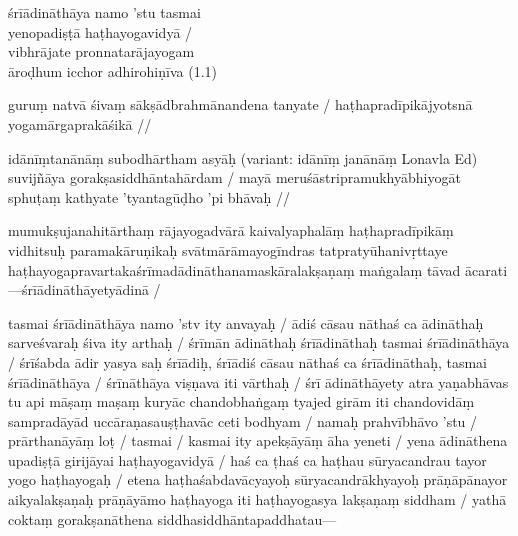 ﻿%


\setlength{\footmarkwidth}{1.3em}
\setlength{\footmarksep}{0em}
\setlength{\footparindent}{1.3em}
\usepackage{fnpos}
\makeFNbottom




\pagestyle{HPed} %
\begin{ekdosis}
  
  \begin{jyotsna}[hp01_001]
    śrīādināthāya namo ’stu tasmai \\
    yenopadiṣṭā haṭhayogavidyā  / \\
    vibhrājate pronnatarājayogam \\
    āroḍhum icchor adhirohiṇīva (1.1)     

    guruṃ natvā śivaṃ sākṣādbrahmānandena tanyate /
    haṭhapradīpikājyotsnā yogamārgaprakāśikā //

    idānīṃtanānāṃ subodhārtham asyāḥ     (variant: idānīṃ janānāṃ Lonavla Ed) 	
    suvijñāya gorakṣasiddhāntahārdam /
    mayā meruśāstripramukhyābhiyogāt
    sphuṭaṃ kathyate 'tyantagūḍho 'pi bhāvaḥ //

    mumukṣujanahitārthaṃ rājayogadvārā kaivalyaphalāṃ haṭhapradīpikāṃ vidhitsuḥ paramakāruṇikaḥ
    svātmārāmayogīndras tatpratyūhanivṛttaye haṭhayogapravartakaśrīmadādināthanamaskāralakṣaṇaṃ
    maṅgalaṃ tāvad ācarati—śrīādināthāyetyādinā /

    tasmai śrīādināthāya namo 'stv ity anvayaḥ / ādiś cāsau nāthaś ca ādināthaḥ sarveśvaraḥ śiva ity
    arthaḥ / śrīmān ādināthaḥ śrīādināthaḥ tasmai śrīādināthāya / śrīśabda ādir yasya saḥ śrīādiḥ,
    śrīādiś cāsau nāthaś ca śrīādināthaḥ, tasmai śrīādināthāya / śrīnāthāya viṣṇava iti vārthaḥ / śrī
    ādināthāyety atra yaṇabhāvas tu api māṣaṃ maṣaṃ kuryāc chandobhaṅgaṃ tyajed girām iti chandovidāṃ
    sampradāyād uccāraṇasauṣṭhavāc ceti bodhyam / namaḥ prahvībhāvo 'stu / prārthanāyāṃ loṭ / tasmai /
    kasmai ity apekṣāyāṃ āha yeneti / yena ādināthena upadiṣṭā girijāyai haṭhayogavidyā / haś ca ṭhaś
    ca haṭhau sūryacandrau tayor yogo haṭhayogaḥ / etena haṭhaśabdavācyayoḥ sūryacandrākhyayoḥ
    prāṇāpānayor aikyalakṣaṇaḥ prāṇāyāmo haṭhayoga iti haṭhayogasya lakṣaṇaṃ siddham / yathā coktaṃ
    gorakṣanāthena siddhasiddhāntapaddhatau—


\end{jyotsna}
\end{ekdosis}

